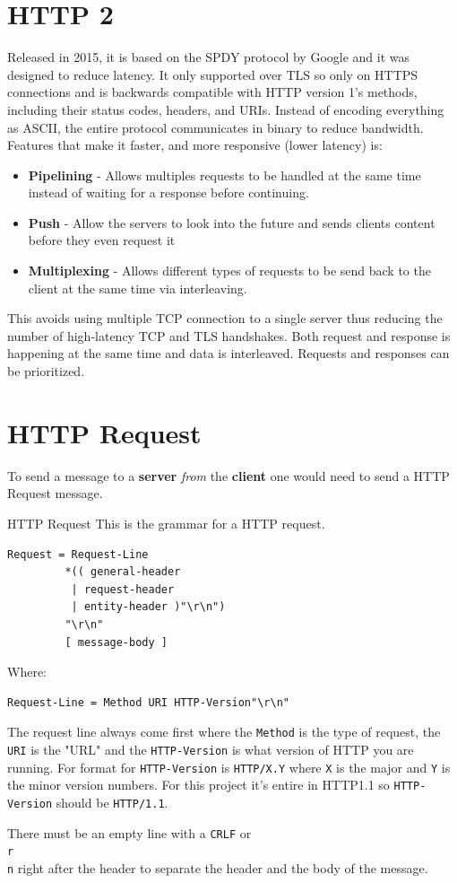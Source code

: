 \documentclass[../CMPUT-404-Notes.tex]{subfiles}
\begin{document}
\section{HTTP 2}
Released in 2015, it is based on the SPDY protocol by Google and it was designed to reduce latency. 
It only supported over TLS so only on HTTPS connections and is backwards compatible with HTTP version 1's methods, including their status codes, headers, and URIs.
Instead of encoding everything as ASCII, the entire protocol communicates in binary to reduce bandwidth. 
Features that make it faster, and more responsive (lower latency) is:
\begin{itemize}
  \item \textbf{Pipelining} - Allows multiples requests to be handled at the same time instead of waiting for a response before continuing. 
  \item \textbf{Push} - Allow the servers to look into the future and sends clients content before they even request it 
  \item \textbf{Multiplexing} - Allows different types of requests to be send back to the client at the same time via interleaving.
\end{itemize}

This avoids using multiple TCP connection to a single server thus reducing the number of high-latency TCP and TLS handshakes.
Both request and response is happening at the same time and data is interleaved. Requests and responses can be prioritized.

\section{HTTP Request}
To send a message to a \textbf{server} \emph{from} the \textbf{client} one would need to send a HTTP Request message.
\newpage

\begin{Definition}{HTTP Request}
This is the grammar for a HTTP request.
\begin{verbatim}
Request = Request-Line              
         *(( general-header        
          | request-header         
          | entity-header )"\r\n")  
         "\r\n"
         [ message-body ]          
\end{verbatim}
Where: 
\begin{verbatim}
Request-Line = Method URI HTTP-Version"\r\n"  
\end{verbatim}
The request line always come first where the \texttt{Method} is the type of request, the \texttt{URI} is the "URL" and the \texttt{HTTP-Version} is what version of HTTP you are running.
For format for \texttt{HTTP-Version} is \texttt{HTTP/X.Y} where \texttt{X} is the major and \texttt{Y} is the minor version numbers.
For this project it's entire in HTTP1.1 so \texttt{HTTP-Version} should be \texttt{HTTP/1.1}.

There must be an empty line with a \texttt{CRLF} or \texttt{\\r\\n} right after the header to separate the header and the body of the message.
\end{Definition}
\end{document}
